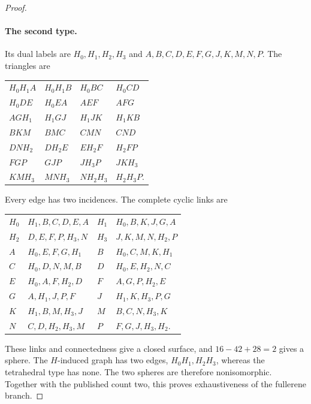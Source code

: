 \documentclass[11pt]{article}
\theoremstyle{remark}
\begin{document}
\begin{proof}
\paragraph{The second type.}
Its dual labels are $H_0,H_1,H_2,H_3$ and
$A,B,C,D,E,F,G,J,K,M,N,P$. The triangles are
\begin{center}\small
\begin{tabular}{llll}
$H_0H_1A$&$H_0H_1B$&$H_0BC$&$H_0CD$\\
$H_0DE$&$H_0EA$&$AEF$&$AFG$\\
$AGH_1$&$H_1GJ$&$H_1JK$&$H_1KB$\\
$BKM$&$BMC$&$CMN$&$CND$\\
$DNH_2$&$DH_2E$&$EH_2F$&$H_2FP$\\
$FGP$&$GJP$&$JH_3P$&$JKH_3$\\
$KMH_3$&$MNH_3$&$NH_2H_3$&$H_2H_3P$.
\end{tabular}
\end{center}
Every edge has two incidences. The complete cyclic links are
\begin{center}\small
\begin{tabular}{ll@{\qquad}ll}
$H_0$&$H_1,B,C,D,E,A$&$H_1$&$H_0,B,K,J,G,A$\\
$H_2$&$D,E,F,P,H_3,N$&$H_3$&$J,K,M,N,H_2,P$\\
$A$&$H_0,E,F,G,H_1$&$B$&$H_0,C,M,K,H_1$\\
$C$&$H_0,D,N,M,B$&$D$&$H_0,E,H_2,N,C$\\
$E$&$H_0,A,F,H_2,D$&$F$&$A,G,P,H_2,E$\\
$G$&$A,H_1,J,P,F$&$J$&$H_1,K,H_3,P,G$\\
$K$&$H_1,B,M,H_3,J$&$M$&$B,C,N,H_3,K$\\
$N$&$C,D,H_2,H_3,M$&$P$&$F,G,J,H_3,H_2$.
\end{tabular}
\end{center}
These links and connectedness give a closed surface, and
$16-42+28=2$ gives a sphere. The $H$-induced graph has two edges,
$H_0H_1,H_2H_3$, whereas the tetrahedral type has none. The two spheres
are therefore nonisomorphic. Together with the published count two,
this proves exhaustiveness of the fullerene branch.


\end{proof}
\end{document}
